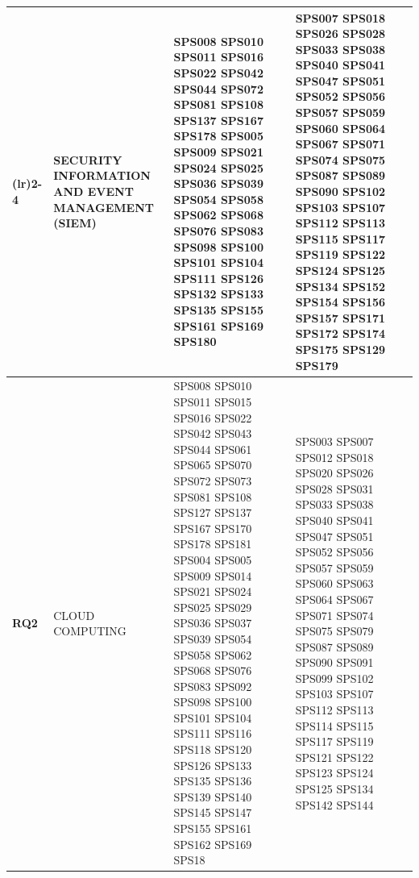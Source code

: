 \begin{table}[htbp]
\begin{tabularx}{\textwidth}{p{0.5cm}p{1.5cm}>{\raggedright\arraybackslash}X>{\raggedright\arraybackslash}X>{\raggedright\arraybackslash}X}
		\addlinespace[0.3em]
		\cmidrule(lr){2-4}
											  & SECURITY INFORMATION 
											  AND EVENT MANAGEMENT (SIEM) & SPS008 SPS010 SPS011 SPS016 SPS022 SPS042 
																			SPS044 SPS072 SPS081 SPS108 SPS137 SPS167 
																			SPS178	SPS005 SPS009 SPS021 SPS024 SPS025 
																			SPS036 SPS039 SPS054 SPS058 SPS062 SPS068 
																			SPS076 SPS083 SPS098 SPS100 SPS101 SPS104 
																			SPS111 SPS126 SPS132 SPS133 SPS135 SPS155 
																			SPS161 SPS169 SPS180						& SPS007 SPS018 SPS026 SPS028 SPS033 SPS038 
																														  SPS040 SPS041 SPS047 SPS051 SPS052 SPS056 
																														  SPS057 SPS059 SPS060 SPS064 SPS067 SPS071 
																														  SPS074 SPS075 SPS087 SPS089 SPS090 SPS102 
																														  SPS103 SPS107 SPS112 SPS113 SPS115 SPS117 
																														  SPS119 SPS122 SPS124 SPS125 SPS134 SPS152 
																														  SPS154 SPS156 SPS157 SPS171 SPS172 SPS174 
																														  SPS175 SPS129 SPS179						 \\																														  \midrule %
		\multirow{3}{*}[-2em]{\textbf{RQ2}}   & CLOUD COMPUTING         & SPS008 SPS010 SPS011 SPS015 SPS016 SPS022 
																		  SPS042 SPS043 SPS044 SPS061 SPS065 SPS070 
																		  SPS072 SPS073 SPS081 SPS108 SPS127 SPS137 
																		  SPS167 SPS170 SPS178 SPS181 SPS004 SPS005 
																		  SPS009 SPS014 SPS021 SPS024 SPS025 SPS029 
																		  SPS036 SPS037 SPS039 SPS054 SPS058 SPS062 
																		  SPS068 SPS076 SPS083 SPS092 SPS098 SPS100 
																		  SPS101 SPS104 SPS111 SPS116 SPS118 SPS120 
																		  SPS126 SPS133 SPS135 SPS136 SPS139 SPS140 
																		  SPS145 SPS147 SPS155 SPS161 SPS162 SPS169 
																		  SPS18           							 & SPS003 SPS007 SPS012 SPS018 SPS020 SPS026 
																													   SPS028 SPS031 SPS033 SPS038 SPS040 SPS041 
																													   SPS047 SPS051 SPS052 SPS056 SPS057 SPS059 
																													   SPS060 SPS063 SPS064 SPS067 SPS071 SPS074 
																													   SPS075 SPS079 SPS087 SPS089 SPS090 SPS091 
																													   SPS099 SPS102 SPS103 SPS107 SPS112 SPS113 
																													   SPS114 SPS115 SPS117 SPS119 SPS121 SPS122 
																													   SPS123 SPS124 SPS125 SPS134 SPS142 SPS144 

\end{tabularx}
\end{table}
